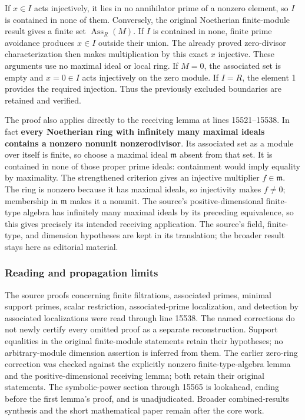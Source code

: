 If \(x\in I\) acts injectively, it lies in no annihilator prime of a nonzero element, so \(I\) is contained in none of them. Conversely, the original Noetherian finite-module result gives a finite set \(\operatorname{Ass}_R(M)\). If \(I\) is contained in none, finite prime avoidance produces \(x\in I\) outside their union. The already proved zero-divisor characterization then makes multiplication by this exact \(x\) injective. These arguments use no maximal ideal or local ring. If \(M=0\), the associated set is empty and \(x=0\in I\) acts injectively on the zero module. If \(I=R\), the element 1 provides the required injection. Thus the previously excluded boundaries are retained and verified.

The proof also applies directly to the receiving lemma at lines 15521--15538. In fact \textbf{every Noetherian ring with infinitely many maximal ideals contains a nonzero nonunit nonzerodivisor}. Its associated set as a module over itself is finite, so choose a maximal ideal \(\mathfrak m\) absent from that set. It is contained in none of those proper prime ideals: containment would imply equality by maximality. The strengthened criterion gives an injective multiplier \(f\in\mathfrak m\). The ring is nonzero because it has maximal ideals, so injectivity makes \(f\ne0\); membership in \(\mathfrak m\) makes it a nonunit. The source's positive-dimensional finite-type algebra has infinitely many maximal ideals by its preceding equivalence, so this gives precisely its intended receiving application. The source's field, finite-type, and dimension hypotheses are kept in its translation; the broader result stays here as editorial material.

\subsubsection{Reading and propagation limits}\label{algebra-proof-004-reading-and-propagation-limits}

The source proofs concerning finite filtrations, associated primes, minimal support primes, scalar restriction, associated-prime localization, and detection by associated localizations were read through line 15538. The named corrections do not newly certify every omitted proof as a separate reconstruction. Support equalities in the original finite-module statements retain their hypotheses; no arbitrary-module dimension assertion is inferred from them. The earlier zero-ring correction was checked against the explicitly nonzero finite-type-algebra lemma and the positive-dimensional receiving lemma; both retain their original statements. The symbolic-power section through 15565 is lookahead, ending before the first lemma's proof, and is unadjudicated. Broader combined-results synthesis and the short mathematical paper remain after the core work.
